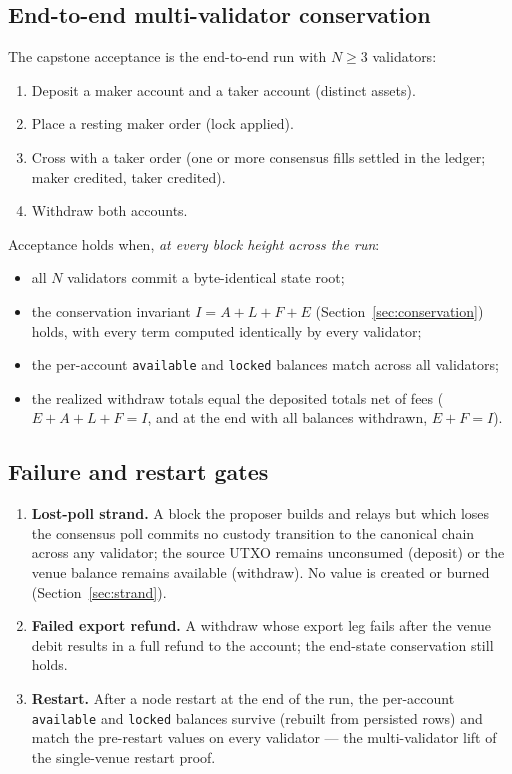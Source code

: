 \subsection{End-to-end multi-validator conservation}

The capstone acceptance is the end-to-end run with $N \ge 3$
validators:

\begin{enumerate}[leftmargin=2em,nosep]
\item Deposit a maker account and a taker account (distinct assets).
\item Place a resting maker order (lock applied).
\item Cross with a taker order (one or more consensus fills settled in
  the ledger; maker credited, taker credited).
\item Withdraw both accounts.
\end{enumerate}

\noindent Acceptance holds when, \emph{at every block height across the
run}:

\begin{itemize}[leftmargin=2em,nosep]
\item all $N$ validators commit a byte-identical state root;
\item the conservation invariant $I = A + L + F + E$
  (Section~\ref{sec:conservation}) holds, with every term computed
  identically by every validator;
\item the per-account \texttt{available} and \texttt{locked} balances
  match across all validators;
\item the realized withdraw totals equal the deposited totals net of
  fees ($E + A + L + F = I$, and at the end with all balances withdrawn,
  $E + F = I$).
\end{itemize}

\subsection{Failure and restart gates}

\begin{enumerate}[leftmargin=2em,nosep]
\item \textbf{Lost-poll strand.} A block the proposer builds and relays
  but which loses the consensus poll commits no custody transition to
  the canonical chain across any validator; the source UTXO remains
  unconsumed (deposit) or the venue balance remains available
  (withdraw). No value is created or burned
  (Section~\ref{sec:strand}).
\item \textbf{Failed export refund.} A withdraw whose export leg fails
  after the venue debit results in a full refund to the account; the
  end-state conservation still holds.
\item \textbf{Restart.} After a node restart at the end of the run, the
  per-account \texttt{available} and \texttt{locked} balances survive
  (rebuilt from persisted rows) and match the pre-restart values on
  every validator --- the multi-validator lift of the single-venue
  restart proof.
\end{enumerate}

